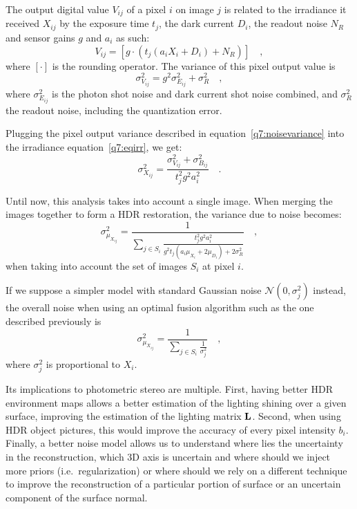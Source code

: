\documentclass{report}
\begin{document}
The output digital value $V_{ij}$ of a pixel $i$ on image $j$ is related to the irradiance it received $X_{ij}$ by the exposure time $t_j$, the dark current $D_i$, the readout noise $N_R$ and sensor gains $g$ and $a_i$ as such:
\begin{equation}
V_{ij} = \left[ g \cdot \left( t_j \left( a_i X_i + D_i \right ) + N_R\right) \right] \quad,
\end{equation}
where $\left[ \cdot \right]$ is the rounding operator. The variance of this pixel output value is
\begin{equation}
\label{q7:noisevariance}
\sigma_{V_{ij}}^2 = g^2 \sigma_{E_{ij}}^2 + \sigma_R^2
\quad,
\end{equation}
where $\sigma_{E_{ij}}^2$ is the photon shot noise and dark current shot noise combined, and $\sigma_R^2$ the readout noise, including the quantization error.

Plugging the pixel output variance described in equation~\eqref{q7:noisevariance} into the irradiance equation~\eqref{q7:eqirr}, we get:
\begin{equation}
\sigma_{X_{ij}}^2 = \frac{\sigma_{V_{ij}}^2 + \sigma_{B_{ij}}^2}{t_j^2 g^2 a_i^2} \quad.
\end{equation}

Until now, this analysis takes into account a single image. When merging the images together to form a HDR restoration, the variance due to noise becomes:
\begin{equation}
\sigma_{\mu_{X_{ij}}}^2 = \frac{1}{\sum_{j \in S_i} \frac{t_j^2 g^2 a_i^2}{g^2 t_j \left( a_i \mu_{X_i} + 2 \mu_{D_i} \right) + 2 \sigma_R^2}} \quad,
\end{equation}
when taking into account the set of images $S_i$ at pixel $i$.

If we suppose a simpler model with standard Gaussian noise $\mathcal{N}(0,\sigma_j^2)$ instead, the overall noise when using an optimal fusion algorithm such as the one described previously is
\begin{equation}
\sigma_{\mu_{X_{ij}}}^2 = \frac{1}{\sum_{j \in S_i} \frac{1}{\sigma_j^2}}
\quad,
\end{equation}
where $\sigma_j^2$ is proportional to $X_i$.

Its implications to photometric stereo are multiple. First, having better HDR environment maps allows a better estimation of the lighting shining over a given surface, improving the estimation of the lighting matrix $\mathbf{L}$. Second, when using HDR object pictures, this would improve the accuracy of every pixel intensity $b_i$. Finally, a better noise model allows us to understand where lies the uncertainty in the reconstruction, which 3D axis is uncertain and where should we inject more priors (i.e.\ regularization) or where should we rely on a different technique to improve the reconstruction of a particular portion of surface or an uncertain component of the surface normal.
\end{document}
